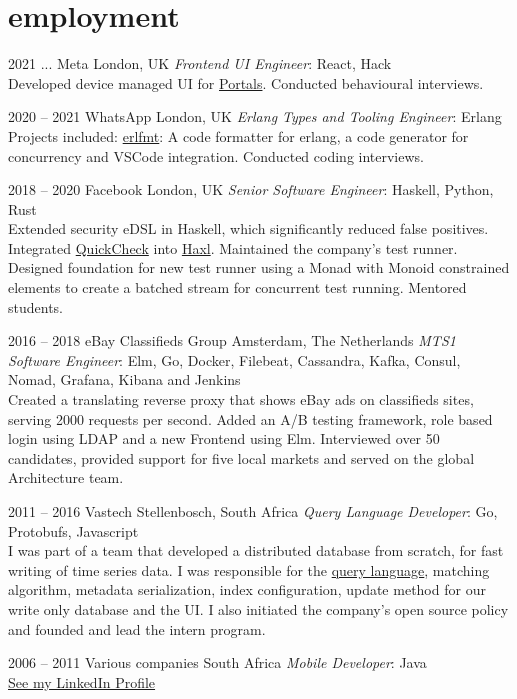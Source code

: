 \documentclass[print]{friggeri-cv-a4} %
\begin{document}
\section{employment}
\begin{entrylist}

\entry
{2021 ...}
{Meta}
{London, UK}
{\emph{Frontend UI Engineer}: React, Hack \\
Developed device managed UI for \href{https://portal.facebook.com/business/}{Portals}. Conducted behavioural interviews.
}

\entry
{2020 -- 2021}
{WhatsApp}
{London, UK}
{\emph{Erlang Types and Tooling Engineer}: Erlang \\
Projects included: \href{https://github.com/whatsapp/erlfmt}{erlfmt}: A code formatter for erlang, a code generator for concurrency and VSCode integration. Conducted coding interviews.
}

\entry
{2018 -- 2020}
{Facebook}
{London, UK}
{\emph{Senior Software Engineer}: Haskell, Python, Rust \\
Extended security eDSL in Haskell, which significantly reduced false positives. Integrated \href{https://hackage.haskell.org/package/QuickCheck}{QuickCheck} into \href{https://github.com/facebook/Haxl}{Haxl}.
Maintained the company's test runner. Designed foundation for new test runner using a Monad with Monoid constrained elements to create a batched stream for concurrent test running.  Mentored students.
}

\entry
{2016 -- 2018}
{eBay Classifieds Group}
{Amsterdam, The Netherlands}
{\emph{MTS1 Software Engineer}: Elm, Go, Docker, Filebeat, Cassandra, Kafka, Consul, Nomad, Grafana, Kibana and Jenkins \\
Created a translating reverse proxy that shows eBay ads on classifieds sites, serving 2000 requests per second. Added an A/B testing framework, role based login using LDAP and a new Frontend using Elm. Interviewed over 50 candidates, provided support for five local markets and served on the global Architecture team.
}

\entry
{2011 -- 2016}
{Vastech}
{Stellenbosch, South Africa}
{\emph{Query Language Developer}: Go, Protobufs, Javascript \\
I was part of a team that developed a distributed database from scratch, for fast writing of time series data. I was responsible for the \href{https://github.com/katydid/katydid}{query language}, matching algorithm, metadata serialization, index configuration, update method for our write only database and the UI. I also initiated the company's open source policy and founded and lead the intern program.
}

\entry
{2006 -- 2011}
{Various companies}
{South Africa}
{\emph{Mobile Developer}: Java \\
\href{https://za.linkedin.com/in/schulzewalter}{See my LinkedIn Profile}}

\end{entrylist}
\end{document}
